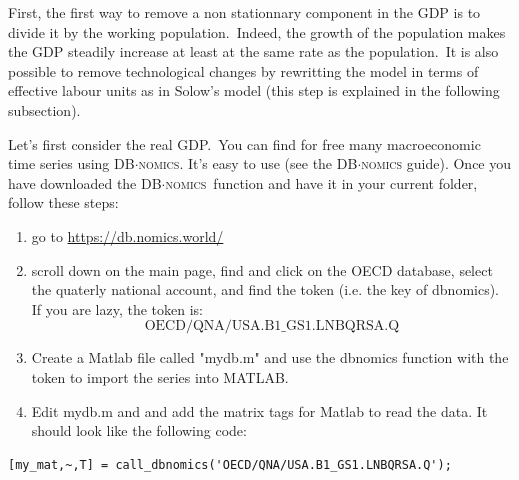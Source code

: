 \documentclass[a4paper,12pt]{article}%
\begin{document}
First, the first way to remove a non stationnary component in the GDP is to
divide it by the working population.\ Indeed, the growth of the population
makes the GDP steadily increase at least at the same rate as the
population.\ It is also possible to remove technological changes by rewritting
the model in terms of effective labour units as in Solow's model (this step is
explained in the following subsection).

Let's first consider the real GDP.\ You can find for free many macroeconomic
time series using \textsc{DB}$\cdot$\textsc{nomics}. It's easy to use (see the
\textsc{DB}$\cdot$\textsc{nomics} guide). Once you have downloaded the
\textsc{DB}$\cdot$\textsc{nomics}\ function and have it in your current
folder, follow these steps:

\begin{enumerate}
\item go to \href{https://db.nomics.world/}{https://db.nomics.world/}

\item scroll down on the main page, find and click on the OECD database,
select the quaterly national account, and find the token (i.e. the key of
dbnomics). If you are lazy, the token is:%
\[
\text{OECD/QNA/USA.B1\_GS1.LNBQRSA.Q}%
\]


\item Create a Matlab file called "\textsf{mydb.m}" and use the dbnomics
function with the token to import the series into MATLAB.

\item Edit \textsf{mydb.m} and and add the matrix tags for Matlab to read the
data. It should look like the following code:
\end{enumerate}

%

\vspace{1ex}
\begin{verbatim}
[my_mat,~,T] = call_dbnomics('OECD/QNA/USA.B1_GS1.LNBQRSA.Q');
\end{verbatim}
\vspace{1ex}%
\end{document}
